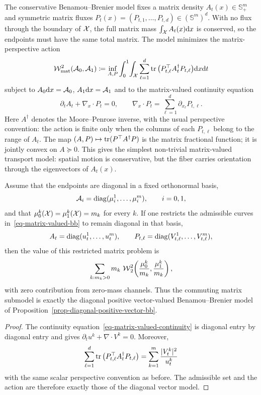 The conservative Benamou--Brenier model fixes a matrix density $A_t(x)\in\mathbb S_+^m$ and symmetric matrix fluxes $P_t(x)=(P_{t,1},\ldots,P_{t,d})\in(\mathbb S^m)^d$. With no flux through the boundary of $\mathcal{X}$, the full matrix mass $\int_{\mathcal{X}} A_t(x)\mathrm{d} x$ is conserved, so the endpoints must have the same total matrix. The model minimizes the matrix-perspective action
\begin{equation}\label{eq-matrix-valued-bb}
\begin{aligned}
\mathcal W_{\mathrm{mat}}^2(\mathcal A_0,\mathcal A_1)
\coloneqq
\inf_{A,P}\int_0^1\!\int_{\mathcal{X}}
\sum_{\ell=1}^d \operatorname{tr}\big(P_{t,\ell}^{\top} A_t^\dagger P_{t,\ell}\big)\mathrm{d} x\mathrm{d} t
\end{aligned}
\end{equation}
subject to $A_0\mathrm{d} x=\mathcal A_0$, $A_1\mathrm{d} x=\mathcal A_1$ and to the matrix-valued continuity equation
\begin{equation}\label{eq-matrix-valued-continuity}
\partial_t A_t+\nabla_x\cdot P_t=0,
\qquad
\nabla_x\cdot P_t=\sum_{\ell=1}^d \partial_{x_\ell}P_{t,\ell}.
\end{equation}
Here $A^\dagger$ denotes the Moore--Penrose inverse, with the usual perspective convention: the action is finite only when the columns of each $P_{t,\ell}$ belong to the range of $A_t$. The map $(A,P)\mapsto\operatorname{tr}(P^{\top}A^\dagger P)$ is the matrix fractional function; it is jointly convex on $A\succeq0$. This gives the simplest non-trivial matrix-valued transport model: spatial motion is conservative, but the fiber carries orientation through the eigenvectors of $A_t(x)$.

\begin{prop}\label{prop-matrix-diagonal-reduction}
Assume that the endpoints are diagonal in a fixed orthonormal basis,
\[
	\mathcal A_i=\operatorname{diag}(\mu_i^1,\ldots,\mu_i^m),
	\qquad i=0,1,
\]
and that $\mu_0^k(\mathcal{X})=\mu_1^k(\mathcal{X})=m_k$ for every $k$. If one restricts the admissible curves in~\eqref{eq-matrix-valued-bb} to remain diagonal in that basis,
\[
	A_t=\operatorname{diag}(u_t^1,\ldots,u_t^m),
	\qquad
	P_{t,\ell}=\operatorname{diag}(V_{t,\ell}^1,\ldots,V_{t,\ell}^m),
\]
then the value of this restricted matrix problem is
\[
	\sum_{k:m_k>0} m_k\,\operatorname{\mathcal{W}}_2^2\!\left(\frac{\mu_0^k}{m_k},\frac{\mu_1^k}{m_k}\right),
\]
with zero contribution from zero-mass channels. Thus the commuting matrix submodel is exactly the diagonal positive vector-valued Benamou--Brenier model of Proposition~\ref{prop-diagonal-positive-vector-bb}.
\end{prop}
\begin{proof}
The continuity equation~\eqref{eq-matrix-valued-continuity} is diagonal entry by diagonal entry and gives $\partial_t u^k+\nabla\cdot V^k=0$. Moreover,
\[
	\sum_{\ell=1}^d \operatorname{tr}\big(P_{t,\ell}^{\top}A_t^\dagger P_{t,\ell}\big)
	=
	\sum_{k=1}^m \frac{|V_t^k|^2}{u_t^k}
\]
with the same scalar perspective convention as before. The admissible set and the action are therefore exactly those of the diagonal vector model.
\end{proof}

